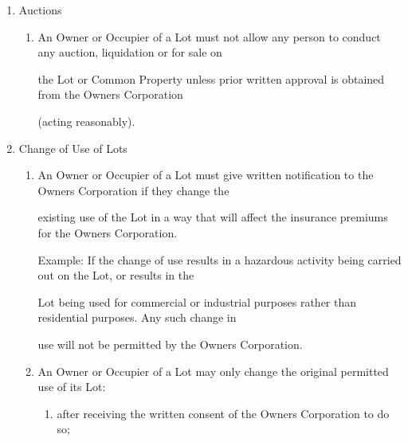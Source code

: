 \documentclass{article}
\begin{document}
\begin{enumerate}[label=\arabic*.]
\begin{enumerate}[label=\arabic{enumi}.\arabic*.]
\begin{enumerate}[label=(\arabic*)]
\begin{enumerate}[label=(\alph*)]
\item {\fontsize{9.962}{1} give at least 7 days’ Notice, except in the case of emergency, where no Noticed is required; and }

\item {\fontsize{9.962}{1} act reasonably to minimise any inconvenience. }

\end{enumerate}
\end{enumerate}
\item {\fontsize{9.99}{1} Auctions }

\begin{enumerate}[label=(\arabic*)]
\item {\fontsize{9.962}{1} An Owner or Occupier of a Lot must not allow any person to conduct any auction, liquidation or for sale on }

{\fontsize{10.02}{1}the Lot or Common Property unless prior written approval is obtained from the Owners Corporation }

{\fontsize{10.02}{1}(acting reasonably). }

\end{enumerate}
\item {\fontsize{9.99}{1} Change of Use of Lots }

\begin{enumerate}[label=(\arabic*)]
\item {\fontsize{9.962}{1} An Owner or Occupier of a Lot must give written notification to the Owners Corporation if they change the }

{\fontsize{10.02}{1}existing use of the Lot in a way that will affect the insurance premiums for the Owners Corporation. }

{\fontsize{10.02}{1}Example: If the change of use results in a hazardous activity being carried out on the Lot, or results in the }

{\fontsize{10.02}{1}Lot being used for commercial or industrial purposes rather than residential purposes. Any such change in }

{\fontsize{10.02}{1}use will not be permitted by the Owners Corporation. }

\item {\fontsize{9.962}{1} An Owner or Occupier of a Lot may only change the original permitted use of its Lot: }

\begin{enumerate}[label=(\alph*)]
\item {\fontsize{9.962}{1} after receiving the written consent of the Owners Corporation to do so; }


\end{enumerate}
\end{enumerate}
\end{enumerate}
\end{enumerate}
\end{document}
